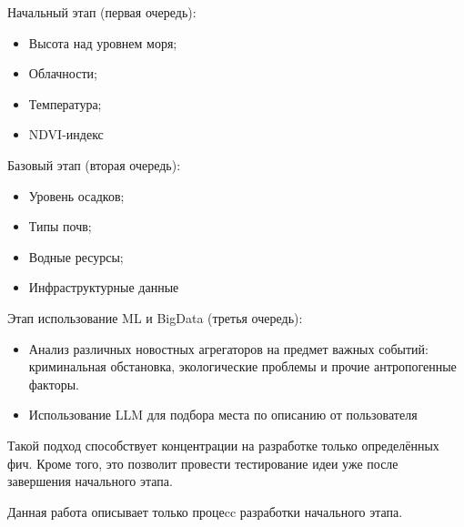 Начальный этап (первая очередь):
\begin{itemize}
	\item Высота над уровнем моря;
	\item Облачности;
	\item Температура;
	\item NDVI-индекс
\end{itemize}

Базовый этап (вторая очередь):
\begin{itemize}
	\item Уровень осадков;
	\item Типы почв;
	\item Водные ресурсы;
	\item Инфраструктурные данные
\end{itemize}

Этап использование ML и BigData (третья очередь):
\begin{itemize}
	\item Анализ различных новостных агрегаторов на предмет важных событий: криминальная обстановка, экологические проблемы и прочие антропогенные факторы.
	\item Использование LLM для подбора места по описанию от пользователя 
\end{itemize}

Такой подход способствует концентрации на разработке только определённых фич.
Кроме того, это позволит провести тестирование идеи уже после завершения начального этапа.

Данная работа описывает только процеcc разработки начального этапа.